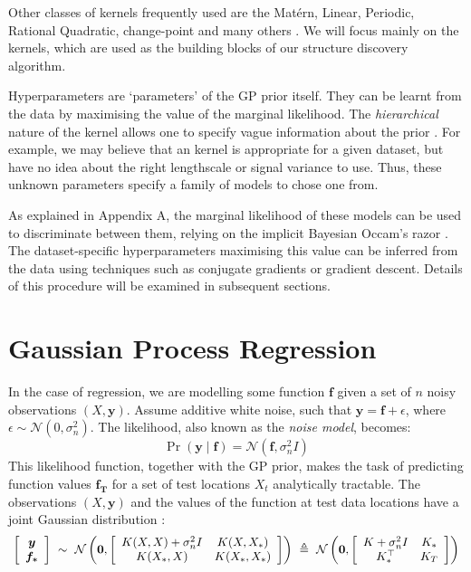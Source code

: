 \documentclass[a4paper,12pt ]{report}
\newcommand*{\Scale}[2][4]{\scalebox{#1}{$#2$}}%
\newcommand{\f}{\mathbf{f}}
\renewcommand{\GP}{{GP}}
\begin{document}
Other classes of kernels frequently used are the Mat\'ern, Linear, Periodic, Rational Quadratic, change-point and many others \cite{rasmussen06, duvenaud13}. We will focus mainly on the {\SE} kernels, which are used as the building blocks of our structure discovery algorithm.

Hyperparameters are `parameters' of the {\GP} prior itself. They can be learnt from the data by maximising the value of the marginal likelihood. The \emph{hierarchical} nature of the kernel allows one to specify vague information about the prior \cite{rasmussenGPs}. For example, we may believe that an {\SE} kernel is appropriate for a given dataset, but have no idea about the right lengthscale or signal variance to use. Thus, these unknown parameters specify a family of models to chose one from.



As explained in Appendix A, the marginal likelihood of these models can be used to discriminate between them, relying on the implicit Bayesian Occam's razor \cite{zoubinoccam}. The dataset-specific hyperparameters maximising this value can be inferred from the data using techniques such as conjugate gradients or gradient descent. Details of this procedure will be examined in subsequent sections.


\section{Gaussian Process Regression}

In the case of regression, we are modelling some function ${\f}$ given a set of $n$ noisy observations $ ({X}, \bm{y})$. Assume additive white noise, such that ${\mathbf{y}} = {\f} + \epsilon$, where $\epsilon \sim \mathcal{N}(0, \sigma_n^2)$. The likelihood, also known as the \emph{noise model}, becomes:
\begin{equation*} \Pr ( \bm{y} \mid \f) =  \mathcal{N}( \f, \sigma_n^2 I) \end{equation*}
This likelihood function, together with the {\GP} prior, makes the task of predicting function values $\mathbf{f_T}$ for a set of test locations $X_t$ analytically tractable. The observations $(X, \bm{y})$ and the values of the function at test data locations have a joint Gaussian distribution \cite{rasmussen06}:
\begin{equation*} \Scale[0.95] { \left[ \begin{array}{c} \bm{y} \\ \bm{f_{*}} \end{array} \right] ~ \sim ~
 \mathcal{N} \left( \bm{0},  \left[ \begin{array}{cc} K(X, X) + \sigma_{n}^2 I & K(X, X_{*}) \\ K(X_{*}, X) & K(X_{*}, X_{*}) \end{array} \right] \right) ~ \triangleq ~
 \mathcal{N} \left( \bm{0},  \left[ \begin{array}{cc} K + \sigma_{n}^2 I & K_{*}  \\ K_{*}^\top & K_{T} \end{array} \right] \right)
 }
\end{equation*}
\end{document}
